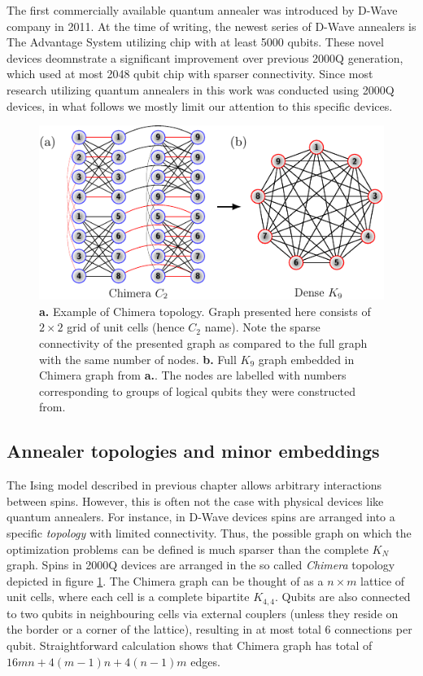 The first commercially available quantum annealer was introduced by D-Wave company in 2011. At the time of writing, the newest series of D-Wave annealers is The Advantage System utilizing chip with at least 5000 qubits. These novel devices deomnstrate a significant improvement over previous 2000Q generation, which used at most 2048 qubit chip with sparser connectivity. Since most research utilizing quantum annealers in this work was conducted using 2000Q devices, in what follows we mostly limit our attention to this specific devices.

\begin{figure}[h]
    \centering
    \includegraphics[width=\textwidth]{figures/chimera.pdf}
    \caption{\textbf{a.} Example of Chimera topology. Graph presented here consists of $2 \times 2$ grid of unit cells (hence $C_2$ name). Note the sparse connectivity of the presented graph as compared to the full graph with the same number of nodes. \textbf{b.} Full $K_9$ graph embedded in Chimera graph from \textbf{a.}. The nodes are labelled with numbers corresponding to groups of logical qubits they were constructed from.}
    \label{fig:chimera}
\end{figure}


\subsection{Annealer topologies and minor embeddings}

The Ising model described in previous chapter allows arbitrary interactions between spins. However, this is often not the case with physical devices like quantum annealers. For instance, in D-Wave devices spins are arranged into a specific \emph{topology} with limited connectivity. Thus, the possible graph on which the optimization problems can be defined is much sparser than the complete $K_{N}$ graph. Spins in 2000Q devices are arranged in the so called \emph{Chimera} topology depicted in figure \ref{fig:chimera}. The Chimera graph can be thought of as a $n \times m$ lattice of unit cells, where each cell is a complete bipartite $K_{4,4}$. Qubits are also connected to two qubits in neighbouring cells via external couplers (unless they reside on the border or a corner of the lattice), resulting in at most total 6 connections per qubit. Straightforward calculation shows that Chimera graph has total of $16mn + 4(m-1)n + 4(n-1)m$ edges.

